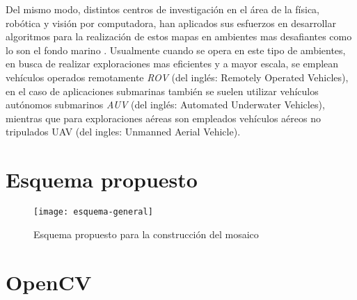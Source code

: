Del mismo modo, distintos centros de investigación en el área de la física, robótica y visión por computadora, han aplicados sus esfuerzos en desarrollar algoritmos para la realización de estos mapas en ambientes mas desafiantes como lo son el fondo marino \cite{gracias-victor,Pizarro-singh,eustice,Allais}. Usualmente cuando se opera en este tipo de ambientes, en busca de realizar exploraciones mas eficientes y a mayor escala, se emplean vehículos operados remotamente \textit{ROV} (del inglés: Remotely Operated Vehicles), en el caso de aplicaciones submarinas también se suelen utilizar vehículos autónomos submarinos \textit{AUV} (del inglés: Automated Underwater Vehicles), mientras que para exploraciones aéreas son empleados vehículos aéreos no tripulados UAV (del ingles: Unmanned Aerial Vehicle).

\section{Esquema propuesto}

\begin{figure}[H]
	\centerline{
		\texttt{[image: esquema-general]}}
		\caption{Esquema propuesto para la construcción del mosaico}
	
	\label{imagen:esquema}
\end{figure}

\section{OpenCV}